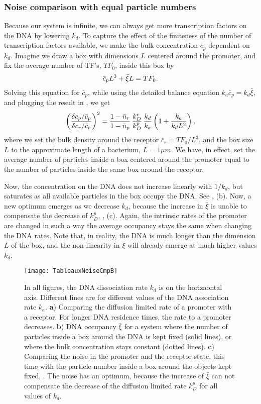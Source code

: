 \subsubsection{Noise comparison with equal particle numbers}
Because our system is infinite, we can always get more transcription factors on the DNA by lowering $k_d$. To capture the effect of the finiteness of the number of transcription factors available, we make the bulk concentration $\bar{c}_p$ dependent on $k_d$. Imagine we draw a box with dimensions $L$ centered around the promoter, and fix the average number of TF's, $TF_0$, inside this box by
\begin{equation}
 \bar{c}_p L^3 + \bar{\xi} L = TF_0.
  \elabel{RecCmpFix}
\end{equation}
Solving this equation for $\bar{c}_p$, while using the detailed balance equation $k_a \bar{c}_p = k_d \bar{\xi}$, and plugging the result in , we get
\begin{equation}
 \left( \frac{\delta c_p / \bar{c}_p}{\delta c_r / \bar{c}_r} \right)^2 = \frac{1-\bar{n}_r}{1-\bar{n}_p} \, \frac{k_D^r}{k_D^p} \, \frac{k_d}{k_a} \left( 1 + \frac{k_a}{k_d L^2}\right),
 \elabel{NoiseCmpB}
\end{equation}
where we set the bulk density around the receptor $\bar{c}_r = TF_0/L^3$, and the box size $L$ to the approximate length of a bacterium, $L=1\mu m$. We have, in effect, set the average number of particles inside a box centered around the promoter equal to the number of particles inside the same box around the receptor. 

Now, the concentration on the DNA does not increase linearly with $1/k_d$, but saturates as all available particles in the box occupy the DNA. See , (b). Now, a new optimum emerges as we decrease $k_d$, because the increase in $\bar{\xi}$ is unable to compensate the decrease of $k_D^p$, , (c). Again, the intrinsic rates of the promoter are changed in such a way the average occupancy stays the same when changing the DNA rates. Note that, in reality, the DNA is much longer than the dimension $L$ of the box, and the non-linearity in $\bar{\xi}$ will already emerge at much higher values $k_d$. 

\begin{figure}[hb!]
\centering
\texttt{[image: TableauxNoiseCmpB]}
\caption{ In all figures, the DNA dissociation rate $k_d$ is on the horizaontal axis. Different lines are for different values of the DNA association rate $k_a$. {\bf a}) Comparing the diffusion limited rate of a promoter with a receptor. For longer DNA residence times, the rate to a promoter decreases. {\bf b}) DNA occupancy $\bar{\xi}$ for a system where the number of particles inside a box around the DNA is kept fixed (solid lines), or where the bulk concentration stays constant (dotted lines). {\bf c}) Comparing the noise in the promoter and the receptor state, this time with the particle number inside a box around the objects kept fixed, . The noise has an optimum, because the increase of $\bar{\xi}$ can not compensate the decrease of the diffusion limited rate $k_D^p$ for all values of $k_d$. 
}
\end{figure}



